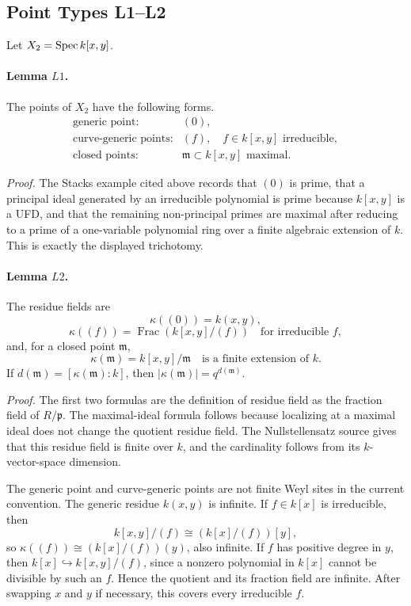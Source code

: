 \subsection{Point Types L1--L2}

Let \(X_2=\operatorname{Spec} k[x,y]\).

\paragraph{Lemma \(L1\).}
The points of \(X_2\) have the following forms.
\[
\begin{array}{ll}
\text{generic point:} & (0),\\
\text{curve-generic points:} & (f),\quad f\in k[x,y]\text{ irreducible},\\
\text{closed points:} & \mathfrak m\subset k[x,y]\text{ maximal}.
\end{array}
\]

\emph{Proof.}
The Stacks example cited above records that \((0)\) is prime, that a principal
ideal generated by an irreducible polynomial is prime because \(k[x,y]\) is a
UFD, and that the remaining non-principal primes are maximal after reducing
to a prime of a one-variable polynomial ring over a finite algebraic
extension of \(k\).  This is exactly the displayed trichotomy.

\paragraph{Lemma \(L2\).}
The residue fields are
\[
  \kappa((0))=k(x,y),
\]
\[
  \kappa((f))=\operatorname{Frac}(k[x,y]/(f))
  \quad\text{for irreducible }f,
\]
and, for a closed point \(\mathfrak m\),
\[
  \kappa(\mathfrak m)=k[x,y]/\mathfrak m
  \quad\text{is a finite extension of }k.
\]
If \(d(\mathfrak m)=[\kappa(\mathfrak m):k]\), then
\(|\kappa(\mathfrak m)|=q^{d(\mathfrak m)}\).

\emph{Proof.}
The first two formulas are the definition of residue field as the fraction
field of \(R/\mathfrak p\).  The maximal-ideal formula follows because
localizing at a maximal ideal does not change the quotient residue field.
The Nullstellensatz source gives that this residue field is finite over
\(k\), and the cardinality follows from its \(k\)-vector-space dimension.

The generic point and curve-generic points are not finite Weyl sites in the
current convention.  The generic residue \(k(x,y)\) is infinite.  If
\(f\in k[x]\) is irreducible, then
\[
  k[x,y]/(f)\cong (k[x]/(f))[y],
\]
so \(\kappa((f))\cong (k[x]/(f))(y)\), also infinite.  If \(f\) has positive
degree in \(y\), then \(k[x]\hookrightarrow k[x,y]/(f)\), since a nonzero
polynomial in \(k[x]\) cannot be divisible by such an \(f\).  Hence the
quotient and its fraction field are infinite.  After swapping \(x\) and \(y\)
if necessary, this covers every irreducible \(f\).

